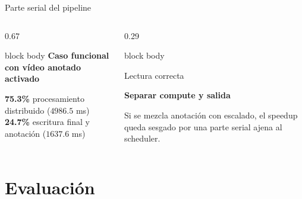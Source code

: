 \documentclass[aspectratio=169,11pt]{beamer}
\newcommand{\metriccard}[3]{
  \begin{beamercolorbox}[wd=\linewidth,sep=0.65em,rounded=true,shadow=false]{block body}
    {\small\color{GraphGray}#1\par}
    \vspace{0.1em}
    {\bfseries\fontsize{16}{18}\selectfont #2\par}
    \vspace{0.1em}
    {\footnotesize #3\par}
  \end{beamercolorbox}
}
\begin{document}
\begin{frame}{Parte serial del pipeline}
  \small
  \begin{columns}[T,totalwidth=\textwidth]
    \begin{column}{0.67\textwidth}
      \begin{beamercolorbox}[wd=\linewidth,sep=0.7em,rounded=true,shadow=false]{block body}
        {\bfseries Caso funcional con vídeo anotado activado}\par
        \vspace{0.2em}

        \vspace{0.35em}
        \small
        \textbf{75.3\%} procesamiento distribuido (\(4986.5\) ms)\\
        \textbf{24.7\%} escritura final y anotación (\(1637.6\) ms)
      \end{beamercolorbox}
    \end{column}
    \begin{column}{0.29\textwidth}
      \metriccard{Lectura correcta}{Separar compute y salida}{Si se mezcla anotación con escalado, el speedup queda sesgado por una parte serial ajena al scheduler.}
    \end{column}
  \end{columns}
\end{frame}

\section{Evaluación}
\end{document}
